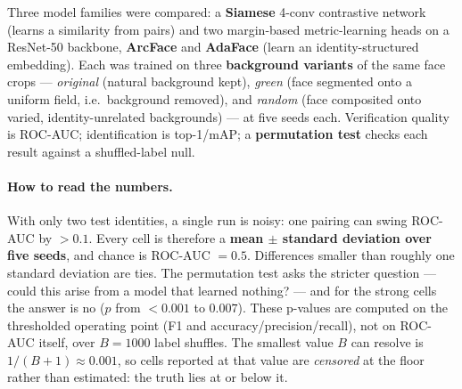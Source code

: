\documentclass[11pt]{article}
\begin{document}
Three model families were compared: a \textbf{Siamese} 4-conv contrastive network (learns a
similarity from pairs) and two margin-based metric-learning heads on a ResNet-50 backbone,
\textbf{ArcFace} and \textbf{AdaFace} (learn an identity-structured embedding). Each was trained on
three \textbf{background variants} of the same face crops --- \emph{original} (natural background
kept), \emph{green} (face segmented onto a uniform field, i.e.\ background removed), and \emph{random}
(face composited onto varied, identity-unrelated backgrounds) --- at five seeds each. Verification
quality is ROC-AUC; identification is top-1/mAP; a \textbf{permutation test} checks each result
against a shuffled-label null.

\paragraph{How to read the numbers.} With only two test identities, a single run is noisy: one
pairing can swing ROC-AUC by $>0.1$. Every cell is therefore a \textbf{mean $\pm$ standard deviation
over five seeds}, and chance is ROC-AUC $=0.5$. Differences smaller than roughly one standard
deviation are ties. The permutation test asks the stricter question --- could this arise from a model
that learned nothing? --- and for the strong cells the answer is no ($p$ from $<0.001$ to $0.007$).
These p-values are computed on the thresholded operating point (F1 and accuracy/precision/recall),
not on ROC-AUC itself, over $B=1000$ label shuffles. The smallest value $B$ can resolve is
$1/(B+1)\approx0.001$, so cells reported at that value are \emph{censored} at the floor rather than
estimated: the truth lies at or below it.
\end{document}
